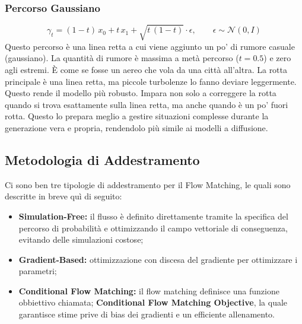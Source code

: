 \subsubsection{Percorso Gaussiano}

\begin{equation}
    \gamma_t = (1-t)\,x_0 + t\,x_1 + \sqrt{t\,(1-t)}\cdot\epsilon, \qquad \epsilon\sim\mathcal{N}(0,I)
\end{equation}
Questo percorso è una linea retta a cui viene aggiunto un po' di rumore casuale (gaussiano). La quantità di rumore è massima a metà percorso ($t=0.5$) e zero agli estremi. È come se fosse un aereo che vola da una città all'altra. La rotta principale è una linea retta, ma piccole turbolenze lo fanno deviare leggermente. Questo rende il modello più robusto. Impara non solo a correggere la rotta quando si trova esattamente sulla linea retta, ma anche quando è un po' fuori rotta. Questo lo prepara meglio a gestire situazioni complesse durante la generazione vera e propria, rendendolo più simile ai modelli a diffusione.

\subsection{Metodologia di Addestramento}
Ci sono ben tre tipologie di addestramento per il Flow Matching, le quali sono descritte in breve quì di seguito:
\begin{itemize}
    \item \textbf{Simulation-Free:} il flusso è definito direttamente tramite la specifica del percorso di probabilità e ottimizzando il campo vettoriale di conseguenza, evitando delle simulazioni costose;
    \item \textbf{Gradient-Based:} ottimizzazione con discesa del gradiente per ottimizzare i parametri;
    \item \textbf{Conditional Flow Matching:} il flow matching definisce una funzione obbiettivo chiamata; \textbf{Conditional Flow Matching Objective}, la quale garantisce stime prive di bias dei gradienti e un efficiente allenamento.
\end{itemize}

